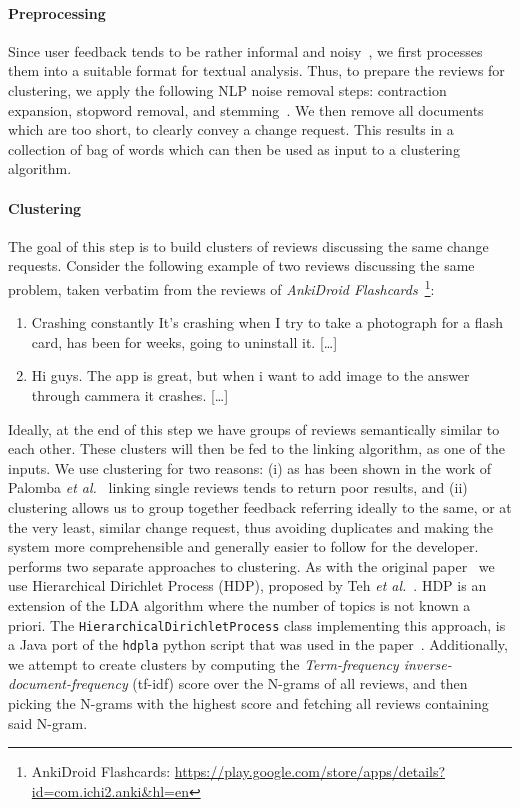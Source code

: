 \paragraph{Preprocessing}
Since user feedback tends to be rather informal and noisy~\cite{Mernik:2005}, we first processes them into a suitable format for textual analysis. Thus, to prepare the reviews for clustering, we apply the following NLP noise removal steps: contraction expansion, stopword removal, and stemming~\cite{Palomba2017}. We then remove all documents which are too short, to clearly convey a change request. This results in a collection of bag of words which can then be used as input to a clustering algorithm.

\paragraph{Clustering}
The goal of this step is to build clusters of reviews discussing the same change requests. Consider the following example of two reviews discussing the same problem, taken verbatim from the reviews of \textit{AnkiDroid Flashcards}~\footnote{AnkiDroid Flashcards: \url{https://play.google.com/store/apps/details?id=com.ichi2.anki&hl=en}}: \begin{enumerate}
\item  Crashing constantly It's crashing when I try to take a photograph for a flash card, has been for weeks, going to uninstall it. […]
\item Hi guys. The app is great, but when i want to add image to the answer through cammera it crashes. […]
\end{enumerate}
Ideally, at the end of this step we have groups of reviews semantically similar to each other. These clusters will then be fed to the linking algorithm, as one of the inputs. We use clustering for two reasons: (i) as has been shown in the work of Palomba \textit{et al.}~\cite{Palomba2017} linking single reviews tends to return poor results, and (ii) clustering allows us to group together feedback referring ideally to the same, or at the very least, similar change request, thus avoiding duplicates and making the system more comprehensible and generally easier to follow for the developer. \tool{} performs two separate approaches to clustering. As with the original \tool{} paper~\cite{Palomba2017} we use Hierarchical Dirichlet Process (HDP), proposed by Teh \textit{et al.}~\cite{teh2005sharing}. HDP is an extension of the LDA algorithm where the number of topics is not known a priori. The \texttt{HierarchicalDirichletProcess} class implementing this approach, is a Java port of the \texttt{hdpla} python script that was used in the \tool{} paper~\cite{Palomba2017}.
Additionally, we attempt to create clusters by computing the \textit{Term-frequency inverse-document-frequency} (tf-idf) score over the N-grams of all reviews, and then picking the N-grams with the highest score and fetching all reviews containing said N-gram. 

